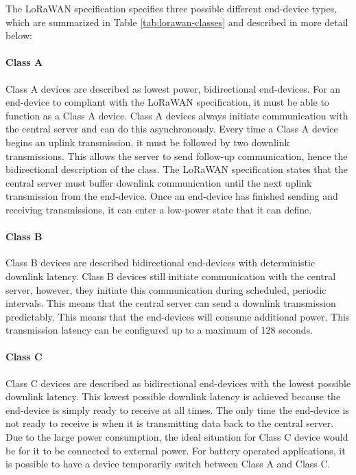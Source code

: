 The LoRaWAN specification specifies three possible different end-device types, which are summarized in Table \ref{tab:lorawan-classes} and described in more detail below:

\paragraph{Class A}
Class A devices are described as lowest power, bidirectional end-devices. For an end-device to compliant with the LoRaWAN specification, it must be able to function as a Class A device. Class A devices always initiate communication with the central server and can do this asynchronously. Every time a Class A device begins an uplink transmission, it must be followed by two downlink transmissions. This allows the server to send follow-up communication, hence the bidirectional description of the class. The LoRaWAN specification states that the central server must buffer downlink communication until the next uplink transmission from the end-device. Once an end-device has finished sending and receiving transmissions, it can enter a low-power state that it can define.

\paragraph{Class B}
Class B devices are described bidirectional end-devices with deterministic downlink latency. Class B devices still initiate communication with the central server, however, they initiate this communication during scheduled, periodic intervals. This means that the central server can send a downlink transmission predictably. This means that the end-devices will consume additional power. This transmission latency can be configured up to a maximum of 128 seconds.

\paragraph{Class C}
Class C devices are described as bidirectional end-devices with the lowest possible downlink latency. This lowest possible downlink latency is achieved because the end-device is simply ready to receive at all times. The only time the end-device is not ready to receive is when it is transmitting data back to the central server. Due to the large power consumption, the ideal situation for Class C device would be for it to be connected to external power. For battery operated applications, it is possible to have a device temporarily switch between Class A and Class C.

